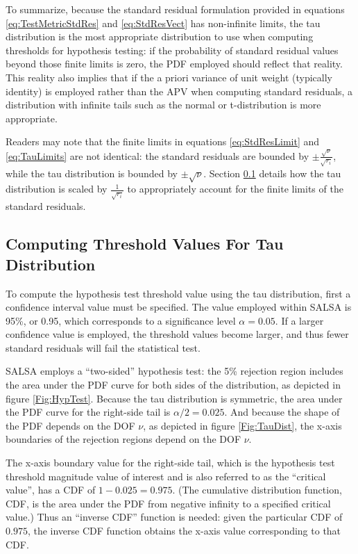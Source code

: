 To summarize, because the standard residual formulation provided in equations \ref{eq:TestMetricStdRes} and \ref{eq:StdResVect} has non-infinite limits, the tau distribution is the most appropriate distribution to use when computing thresholds for hypothesis testing: if the probability of standard residual values beyond those finite limits is zero, the PDF employed should reflect that reality. This reality also implies that if the a priori variance of unit weight (typically identity) is employed rather than the APV when computing standard residuals, a distribution with infinite tails such as the normal or t-distribution is more appropriate. 

Readers may note that the finite limits in equations \ref{eq:StdResLimit} and \ref{eq:TauLimits} are not identical: the standard residuals are bounded by $\pm \frac{\sqrt{\nu}}{\sqrt{r_i}}$, while the tau distribution is bounded by $\pm \sqrt{\nu}$. Section \ref{sec:ComputeThreshold} details how the tau distribution is scaled by $\frac{1}{\sqrt{r_i}}$ to appropriately account for the finite limits of the standard residuals. 

\subsection{Computing Threshold Values For Tau Distribution} \label{sec:ComputeThreshold}

To compute the hypothesis test threshold value using the tau distribution, first a confidence interval value must be specified. The value employed within SALSA is 95\%, or 0.95, which corresponds to a significance level $\alpha = 0.05$. If a larger confidence value is employed, the threshold values become larger, and thus fewer standard residuals will fail the statistical test.

SALSA employs a ``two-sided'' hypothesis test: the 5\% rejection region includes the area under the PDF curve for both sides of the distribution, as depicted in figure \ref{Fig:HypTest}. Because the tau distribution is symmetric, the area under the PDF curve for the right-side tail is $\alpha/2 = 0.025$. And because the shape of the PDF depends on the DOF $\nu$, as depicted in figure \ref{Fig:TauDist}, the x-axis boundaries of the rejection regions depend on the DOF $\nu$. 

The x-axis boundary value for the right-side tail, which is the hypothesis test threshold magnitude value of interest and is also referred to as the ``critical value'', has a CDF of $1-0.025 = 0.975$. (The cumulative distribution function, CDF, is the area under the PDF from negative infinity to a specified critical value.) Thus an ``inverse CDF'' function is needed: given the particular CDF of $0.975$, the inverse CDF function obtains the x-axis value corresponding to that CDF. 

